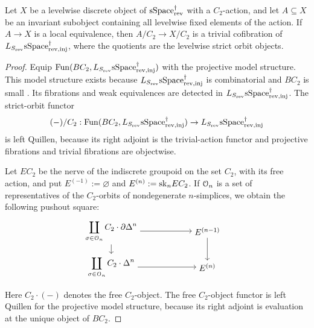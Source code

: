 \documentclass[a4paper,dvipdfmx,11pt]{amsart}
\begin{document}
\begin{lemma}\label{h1.lem.borel}
  Let $X$ be a levelwise discrete object of $\mathrm{sSpace}^{\dag}_{\mathrm{rev}}$ with a $C_2$-action, and let $A\subseteq X$ be an invariant subobject containing all levelwise fixed elements of the action.
  If $A\to X$ is a local equivalence, then $A/C_2\to X/C_2$ is a trivial cofibration of $L_{S_{\mathrm{rev}}}\mathrm{sSpace}^{\dag}_{\mathrm{rev},\mathrm{inj}}$, where the quotients are the levelwise strict orbit objects.
\end{lemma}

\begin{proof}
  Equip $\mathrm{Fun}(BC_{2},L_{S_{\mathrm{rev}}}\mathrm{sSpace}^{\dag}_{\mathrm{rev},\mathrm{inj}})$ with the projective model structure.
  This model structure exists because $L_{S_{\mathrm{rev}}}\mathrm{sSpace}^{\dag}_{\mathrm{rev},\mathrm{inj}}$ is combinatorial and $BC_{2}$ is small \cite[Proposition~A.2.8.2]{HTT}.
  Its fibrations and weak equivalences are detected in $L_{S_{\mathrm{rev}}}\mathrm{sSpace}^{\dag}_{\mathrm{rev},\mathrm{inj}}$.
  The strict-orbit functor
  \begin{align}
    (-)/C_2:
    \mathrm{Fun}(BC_{2},L_{S_{\mathrm{rev}}}\mathrm{sSpace}^{\dag}_{\mathrm{rev},\mathrm{inj}})
    \to
    L_{S_{\mathrm{rev}}}\mathrm{sSpace}^{\dag}_{\mathrm{rev},\mathrm{inj}}
  \end{align}
  is left Quillen, because its right adjoint is the trivial-action functor and projective fibrations and trivial fibrations are objectwise.

  Let $EC_2$ be the nerve of the indiscrete groupoid on the set $C_2$, with its free action, and put $E^{(-1)}:=\varnothing$ and $E^{(n)}:=\mathrm{sk}_nEC_2$.
  If $\mathcal{O}_n$ is a set of representatives of the $C_2$-orbits of nondegenerate $n$-simplices, we obtain the following pushout square:
  \begin{align}
    &\begin{tikzpicture}[auto]
      \node (boundary) at (0,1.5) {$\displaystyle
        \coprod_{\sigma\in\calO_n}
        C_2\mathbin{\cdot}\partial\Delta^n$};
      \node (previous-skeleton) at (4,1.5) {$E^{(n-1)}$};
      \node (simplex) at (0,0) {$\displaystyle
        \coprod_{\sigma\in\calO_n}
        C_2\mathbin{\cdot}\Delta^n$};
      \node (skeleton) at (4,0) {$E^{(n)}$};
      \draw[->]
        (boundary) -- (previous-skeleton);
      \draw[->]
        (boundary) -- (simplex);
      \draw[->]
        (previous-skeleton) -- (skeleton);
      \draw[->]
        (simplex) -- (skeleton);
    \end{tikzpicture}
  \end{align}
  Here $C_2\mathbin{\cdot}(-)$ denotes the free $C_2$-object.
  The free $C_2$-object functor is left Quillen for the projective model structure, because its right adjoint is evaluation at the unique object of $BC_{2}$.
  

\end{proof}
\end{document}
